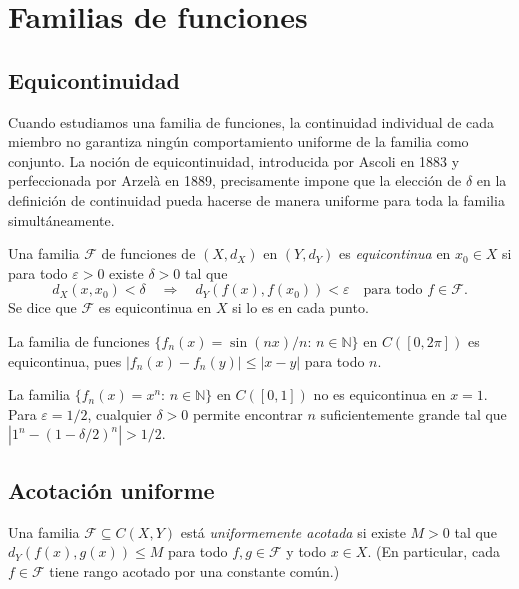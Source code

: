\chapter{Familias de funciones}
\label{ch:familias-funciones}

\section{Equicontinuidad}

Cuando estudiamos una familia de funciones, la continuidad individual de cada miembro no garantiza ningún comportamiento uniforme de la familia como conjunto. La noción de equicontinuidad, introducida por Ascoli en 1883 y perfeccionada por Arzelà en 1889, precisamente impone que la elección de $\delta$ en la definición de continuidad pueda hacerse de manera uniforme para toda la familia simultáneamente.

\begin{definition}
\label{def:equicontinuidad}
Una familia $\mathcal{F}$ de funciones de $(X,d_X)$ en $(Y,d_Y)$ es \emph{equicontinua} en $x_0\in X$ si para todo $\varepsilon>0$ existe $\delta>0$ tal que
\[
  d_X(x,x_0)<\delta\quad\Longrightarrow\quad d_Y(f(x),f(x_0))<\varepsilon\quad\text{para todo }f\in\mathcal{F}.
\]
Se dice que $\mathcal{F}$ es equicontinua en $X$ si lo es en cada punto.
\end{definition}

\begin{example}
\label{ej:equicontinua}
La familia de funciones $\{f_n(x)=\sin(nx)/n:\,n\in\mathbb{N}\}$ en $C([0,2\pi])$ es equicontinua, pues $|f_n(x)-f_n(y)|\leq |x-y|$ para todo $n$.
\end{example}

\begin{example}
\label{ej:no-equicontinua}
La familia $\{f_n(x)=x^n:\,n\in\mathbb{N}\}$ en $C([0,1])$ no es equicontinua en $x=1$. Para $\varepsilon=1/2$, cualquier $\delta>0$ permite encontrar $n$ suficientemente grande tal que $|1^n-(1-\delta/2)^n|>1/2$.
\end{example}

\section{Acotación uniforme}

\begin{definition}
\label{def:acotacion-uniforme}
Una familia $\mathcal{F}\subseteq C(X,Y)$ está \emph{uniformemente acotada} si existe $M>0$ tal que $d_Y(f(x),g(x))\leq M$ para todo $f,g\in\mathcal{F}$ y todo $x\in X$. (En particular, cada $f\in\mathcal{F}$ tiene rango acotado por una constante común.)
\end{definition}

